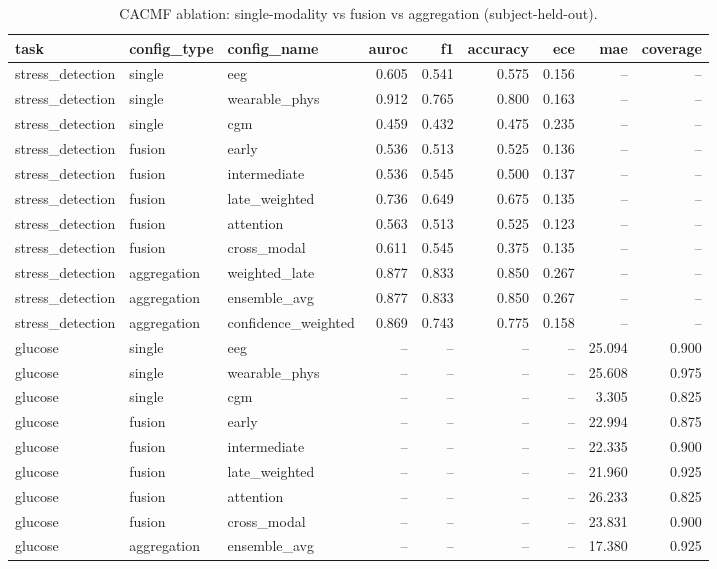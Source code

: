 \begin{table}[t]
\centering
\caption{CACMF ablation: single-modality vs fusion vs aggregation (subject-held-out).}
\label{tab:ablation}
\begin{tabular}{lllrrrrrr}
\toprule
task & config\_type & config\_name & auroc & f1 & accuracy & ece & mae & coverage \\
\midrule
stress\_detection & single & eeg & 0.605 & 0.541 & 0.575 & 0.156 & -- & -- \\
stress\_detection & single & wearable\_phys & 0.912 & 0.765 & 0.800 & 0.163 & -- & -- \\
stress\_detection & single & cgm & 0.459 & 0.432 & 0.475 & 0.235 & -- & -- \\
stress\_detection & fusion & early & 0.536 & 0.513 & 0.525 & 0.136 & -- & -- \\
stress\_detection & fusion & intermediate & 0.536 & 0.545 & 0.500 & 0.137 & -- & -- \\
stress\_detection & fusion & late\_weighted & 0.736 & 0.649 & 0.675 & 0.135 & -- & -- \\
stress\_detection & fusion & attention & 0.563 & 0.513 & 0.525 & 0.123 & -- & -- \\
stress\_detection & fusion & cross\_modal & 0.611 & 0.545 & 0.375 & 0.135 & -- & -- \\
stress\_detection & aggregation & weighted\_late & 0.877 & 0.833 & 0.850 & 0.267 & -- & -- \\
stress\_detection & aggregation & ensemble\_avg & 0.877 & 0.833 & 0.850 & 0.267 & -- & -- \\
stress\_detection & aggregation & confidence\_weighted & 0.869 & 0.743 & 0.775 & 0.158 & -- & -- \\
glucose & single & eeg & -- & -- & -- & -- & 25.094 & 0.900 \\
glucose & single & wearable\_phys & -- & -- & -- & -- & 25.608 & 0.975 \\
glucose & single & cgm & -- & -- & -- & -- & 3.305 & 0.825 \\
glucose & fusion & early & -- & -- & -- & -- & 22.994 & 0.875 \\
glucose & fusion & intermediate & -- & -- & -- & -- & 22.335 & 0.900 \\
glucose & fusion & late\_weighted & -- & -- & -- & -- & 21.960 & 0.925 \\
glucose & fusion & attention & -- & -- & -- & -- & 26.233 & 0.825 \\
glucose & fusion & cross\_modal & -- & -- & -- & -- & 23.831 & 0.900 \\
glucose & aggregation & ensemble\_avg & -- & -- & -- & -- & 17.380 & 0.925 \\
\bottomrule
\end{tabular}
\end{table}
